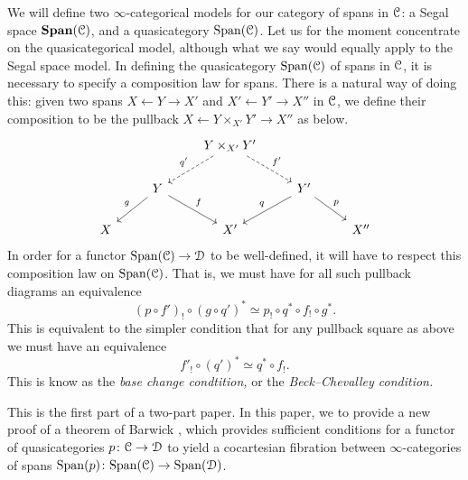 \documentclass[main.tex]{subfiles}
\begin{document}
We will define two $\infty$-categorical models for our category of spans in $\mathcal{C}$: a Segal space $\mathbf{Span}(\mathcal{C})$, and a quasicategory $\mathrm{Span}(\mathcal{C})$. Let us for the moment concentrate on the quasicategorical model, although what we say would equally apply to the Segal space model. In defining the quasicategory $\mathrm{Span}(\mathcal{C})$ of spans in $\mathcal{C}$, it is necessary to specify a composition law for spans. There is a natural way of doing this: given two spans $X \leftarrow Y \rightarrow X'$ and $X' \leftarrow Y' \rightarrow X''$ in $\mathcal{C}$, we define their composition to be the pullback $X \leftarrow Y \times_{X'} Y' \rightarrow X''$ as below.
\begin{equation*}
  \begin{tikzcd}
    && Y \times_{X'} Y'
    \arrow[dl, dashed, swap, "q'"]
    \arrow[dr, dashed, "f'"]
    \\
    & Y
    \arrow[dl, swap, "g"]
    \arrow[dr, "f"]
    && Y'
    \arrow[dl, swap, "q"]
    \arrow[dr, "p"]
    \\
    X
    && X'
    && X''
  \end{tikzcd}
\end{equation*}
In order for a functor $\mathrm{Span}(\mathcal{C}) \to \mathcal{D}$ to be well-defined, it will have to respect this composition law on $\mathrm{Span}(\mathcal{C})$. That is, we must have for all such pullback diagrams an equivalence
\begin{equation*}
  (p \circ f')_{!} \circ (g \circ q')^{*} \simeq p_{!} \circ q^{*} \circ f_{!} \circ g^{*}.
\end{equation*}
This is equivalent to the simpler condition that for any pullback square as above we must have an equivalence
\begin{equation*}
  f'_{!} \circ (q')^{*} \simeq q^{*} \circ f_{!}.
\end{equation*}
This is know as the \emph{base change condtition,} or the \emph{Beck--Chevalley condition.}

This is the first part of a two-part paper. In this paper, we to provide a new proof of a theorem of Barwick \cite[Thm.~12.2]{spectralmackeyfunctors1}, which provides sufficient conditions for a functor of quasicategories $p\colon \mathcal{C} \to \mathcal{D}$ to yield a cocartesian fibration between $\infty$-categories of spans $\mathrm{Span}(p)\colon \mathrm{Span}(\mathcal{C}) \to \mathrm{Span}(\mathcal{D})$.
\end{document}

